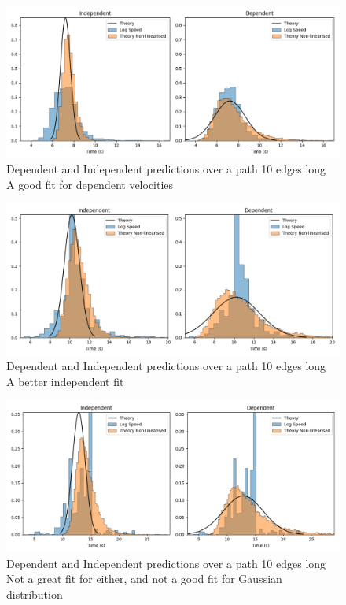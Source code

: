\documentclass{article}
\begin{document}
				\begin{figure}[H]
					\includegraphics[scale=0.5]{non-lin10-10A.png}
					\caption{Dependent and Independent predictions over a path 10 edges long\\A good fit for dependent velocities}
					\label{fig:non-linShort1}
				\end{figure}
				\begin{figure}[H]
					\includegraphics[scale=0.5]{non-lin10-10B.png}
					\caption{Dependent and Independent predictions over a path 10 edges long\\A better independent fit}
					\label{fig:non-linShort2}
				\end{figure}
				\begin{figure}[H]
					\includegraphics[scale=0.5]{non-lin8-10A.png}
					\caption{Dependent and Independent predictions over a path 10 edges long\\Not a great fit for either, and not a good fit for Gaussian distribution}
					\label{fig:non-linShort3}
				\end{figure}
\end{document}
